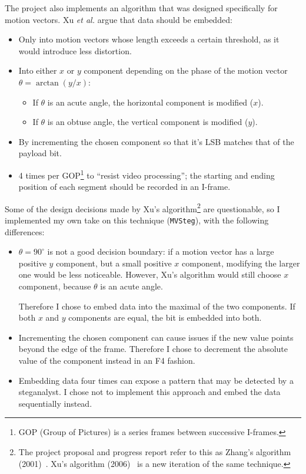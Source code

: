 \documentclass[12pt,british,twoside,notitlepage,usenames,dvipsnames,hypens,final]{report}
\numberwithin{equation}{section}
\numberwithin{figure}{section}
\begin{document}
The project also implements an algorithm that was designed specifically for motion vectors. Xu \emph{et al.} \cite{xu2006steganography} argue that data should be embedded:
\begin{itemize}
\item Only into motion vectors whose length exceeds a certain threshold, as it would introduce less distortion.
\item Into either $x$ or $y$ component depending on the phase of the motion vector $\theta = \arctan(y/x)$:
    \begin{itemize}
    \item If $\theta$ is an acute angle, the horizontal component is modified ($x$).
    \item If $\theta$ is an obtuse angle, the vertical component is modified ($y$).
    \end{itemize}
\item By incrementing the chosen component so that it's LSB matches that of the payload bit.
\item 4 times per GOP\footnote{GOP (Group of Pictures) is a series frames between successive I-frames.} to ``resist video processing''; the starting and ending position of each segment should be recorded in an I-frame.
\end{itemize}

Some of the design decisions made by Xu's algorithm\footnote{The project proposal and progress report refer to this as Zhang's algorithm (2001)~\cite{zhang2001video}. Xu's algorithm (2006)~\cite{xu2006steganography} is a new iteration of the same technique.} are questionable, so I implemented my own take on this technique (\texttt{MVSteg}), with the following differences:
\begin{itemize}
\item $\theta = 90^{\circ}$ is not a good decision boundary: if a motion vector has a large positive $y$ component, but a small positive $x$ component, modifying the larger one would be less noticeable. However, Xu's algorithm would still choose $x$ component, because $\theta$ is an acute angle. 

Therefore I chose to embed data into the maximal of the two components. If both $x$ and $y$ components are equal, the bit is embedded into both. 

\item Incrementing the chosen component can cause issues if the new value points beyond the edge of the frame. Therefore I chose to decrement the absolute value of the component instead in an F4 fashion.

\item Embedding data four times can expose a pattern that may be detected by a steganalyst. I chose not to implement this approach and embed the data sequentially instead.
\end{itemize}
\end{document}
